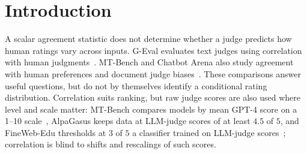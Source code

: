 \section{Introduction}
A scalar agreement statistic does not determine whether a judge predicts how human ratings vary across inputs.
G-Eval evaluates text judges using correlation with human judgments~\citep{liu2023geval}.
MT-Bench and Chatbot Arena also study agreement with human preferences and document judge biases~\citep{zheng2023judging}.
These comparisons answer useful questions, but do not by themselves identify a conditional rating distribution.
Correlation suits ranking, but raw judge scores are also used where level and scale matter: MT-Bench compares models by mean GPT-4 score on a 1--10 scale~\citep{zheng2023judging}, AlpaGasus keeps data at LLM-judge scores of at least $4.5$ of $5$, and FineWeb-Edu thresholds at $3$ of $5$ a classifier trained on LLM-judge scores~\citep{chen2024alpagasus,penedo2024fineweb}; correlation is blind to shifts and rescalings of such scores.

